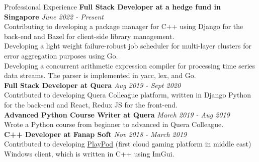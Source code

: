 \documentclass{resume} %
\begin{document}
\begin{rSection}{Professional Experience}
	{\bf Full Stack Developer at a hedge fund in Singapore} \hfill {\em June 2022 - Present}\\
	Contributing to developing a package manager for C++ using Django for the back-end and Bazel for client-side library management.
	\vspace{2mm}\\
	Developing a light weight failure-robust job scheduler for multi-layer clusters for error aggregation purposes using Go.
	\vspace{2mm}\\
	Developing a concurrent arithmetic expression compiler for processing time series data streams. The parser is implemented in yacc, lex, and Go.
	\vspace{2mm}\\
	{\bf {Full Stack Developer at Quera}} \hfill {\em Aug 2019 - Sept 2020}\\
	Contributed to developing Quera Colleague platform, written in Django Python for the back-end and React, Redux JS for the front-end.
	\vspace{2mm}\\
	{\bf {Advanced Python Course Writer at Quera}} \hfill {\em March 2019 - Aug 2019}\\
	Wrote a Python course from beginner to advanced in Quera Colleague.
	\vspace{2mm}\\
	{\bf {C++ Developer at Fanap Soft}} \hfill {\em Nov 2018 - March 2019}\\
	Contributed to developing \href{https://playpod.ir/}{PlayPod} (first cloud gaming platform in middle east) Windows client, which is written in C++ using ImGui.
\end{rSection}
\end{document}
